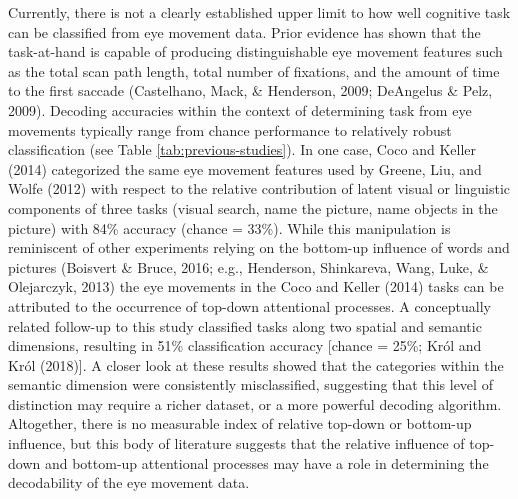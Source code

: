\documentclass[
  english,
  man, donotrepeattitle,floatsintext]{apa6}
\begin{document}
Currently, there is not a clearly established upper limit to how well cognitive task can be classified from eye movement data. Prior evidence has shown that the task-at-hand is capable of producing distinguishable eye movement features such as the total scan path length, total number of fixations, and the amount of time to the first saccade (Castelhano, Mack, \& Henderson, 2009; DeAngelus \& Pelz, 2009). Decoding accuracies within the context of determining task from eye movements typically range from chance performance to relatively robust classification (see Table \ref{tab:previous-studies}). In one case, Coco and Keller (2014) categorized the same eye movement features used by Greene, Liu, and Wolfe (2012) with respect to the relative contribution of latent visual or linguistic components of three tasks (visual search, name the picture, name objects in the picture) with 84\% accuracy (chance = 33\%). While this manipulation is reminiscent of other experiments relying on the bottom-up influence of words and pictures (Boisvert \& Bruce, 2016; e.g., Henderson, Shinkareva, Wang, Luke, \& Olejarczyk, 2013) the eye movements in the Coco and Keller (2014) tasks can be attributed to the occurrence of top-down attentional processes. A conceptually related follow-up to this study classified tasks along two spatial and semantic dimensions, resulting in 51\% classification accuracy {[}chance = 25\%; Król and Król (2018){]}. A closer look at these results showed that the categories within the semantic dimension were consistently misclassified, suggesting that this level of distinction may require a richer dataset, or a more powerful decoding algorithm. Altogether, there is no measurable index of relative top-down or bottom-up influence, but this body of literature suggests that the relative influence of top-down and bottom-up attentional processes may have a role in determining the decodability of the eye movement data.
\end{document}
